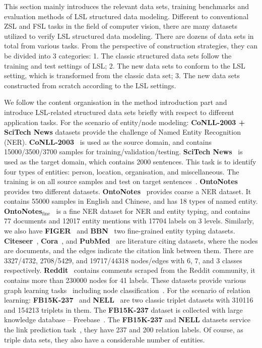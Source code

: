 \label{sec5}
This section mainly introduces the relevant data sets, training benchmarks and evaluation methods of LSL structured data modeling. Different to conventional ZSL and FSL tasks in the field of computer vision, there are many datasets utilized to verify LSL structured data modeling. There are dozens of data sets in total from various tasks. From the perspective of construction strategies, they can be divided into 3 categories: 1. The classic structured data sets follow the training and test settings of LSL; 2. The new data sets to conform to the LSL setting, which is transformed from the classic data set; 3. The new data sets constructed from scratch according to the LSL settings.

\label{sec5.1}
We follow the content organisation in the method introduction part and introduce LSL-related structured data sets briefly with respect to different application tasks.
For the scenario of entity/node modeling:
\textbf{CoNLL-2003 + SciTech News} datasets provide the challenge of Named Entity Recognition (NER).  \textbf{CoNLL-2003}~ is used as the source domain, and  contains 15000/3500/3700 samples for training/validation/testing.  \textbf{SciTech News}~ is used as the target domain, which contains 2000 sentences. This task is to identify four types of entities: person, location, organisation, and miscellaneous. The training is on all source samples and test on target sentences~.
\textbf{OntoNotes} provides two different datasets. \textbf{OntoNotes}~ provides coarse a NER dataset.  It contains  55000 samples in English and Chinese, and has 18 types of named entity.  \textbf{OntoNotes$_{\text{fine}}$}~ is a fine NER dataset for NER and entity typing, and contains 77 documents and 12017 entity mentions with 17704 labels on 3 levels. Similarly, we also have \textbf{FIGER}~ and \textbf{BBN}~ two fine-grained entity typing datasets.
\textbf{Citeseer}~, \textbf{Cora}~, and \textbf{PubMed}~ are literature citing datasets, where the nodes are documents, and the edges indicate the citation link between them. There are 3327/4732, 2708/5429, and 19717/44318 nodes/edges with 6, 7, and 3 classes respectively. \textbf{Reddit}~ contains comments scraped from the Reddit community, it contains more than 230000 nodes for 41 labels. These datasets provide various graph learning tasks~ including node classification~.
For the scenario of relation learning:
\textbf{FB15K-237}~ and \textbf{NELL}~ are two classic triplet datasets with 310116 and 154213 triplets in them. The \textbf{FB15K-237} dataset is collected with large knowledge database -- Freebase~. The \textbf{FB15K-237} and \textbf{NELL} datasets service the link prediction task~, they have 237 and 200 relation labels. Of course, as triple data sets, they also have a considerable number of entities.

